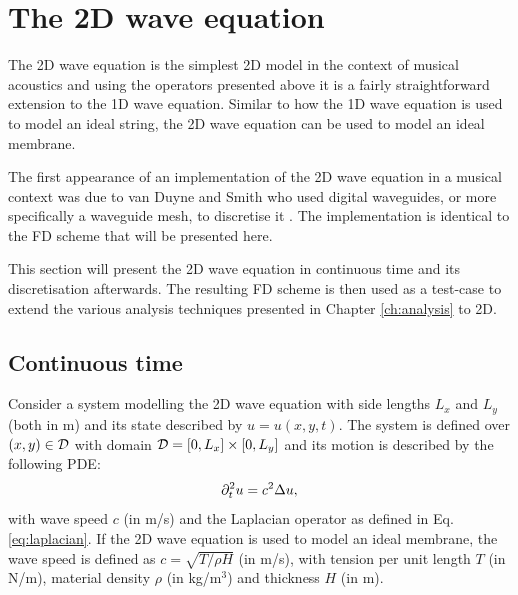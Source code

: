 \section{The 2D wave equation}\label{sec:2Dwave}
The 2D wave equation is the simplest 2D model in the context of musical acoustics and using the operators presented above it is a fairly straightforward extension to the 1D wave equation. Similar to how the 1D wave equation is used to model an ideal string, the 2D wave equation can be used to model an ideal membrane. 

The first appearance of an implementation of the 2D wave equation in a musical context was due to van Duyne and Smith who used digital waveguides, or more specifically a waveguide mesh, to discretise it \cite{Duyne1993}. The implementation is identical to the FD scheme that will be presented here.

This section will present the 2D wave equation in continuous time and its discretisation afterwards. The resulting FD scheme is then used as a test-case to extend the various analysis techniques presented in Chapter \ref{ch:analysis} to 2D.

\subsection{Continuous time}
Consider a system modelling the 2D wave equation with side lengths $L_x$ and $L_y$ (both in m) and its state described by $u = u(x,y,t)$. The system is defined over $(x,y) \in \mathcal{D}$ with domain $\mathcal{D} = [0, L_x] \times[0, L_y]$ and its motion is described by the following PDE:
\begin{equation}\label{eq:2DwavePDE}
    \partial_t^2 u = c^2\Delta u,
\end{equation}
with wave speed $c$ (in m/s) and the Laplacian operator as defined in Eq. \eqref{eq:laplacian}. If the 2D wave equation is used to model an ideal membrane, the wave speed is defined as $c = \sqrt{T/\rho H}$ (in m/s), with tension per unit length $T$ (in N/m), material density $\rho$ (in kg/m$^3$) and thickness $H$ (in m).

